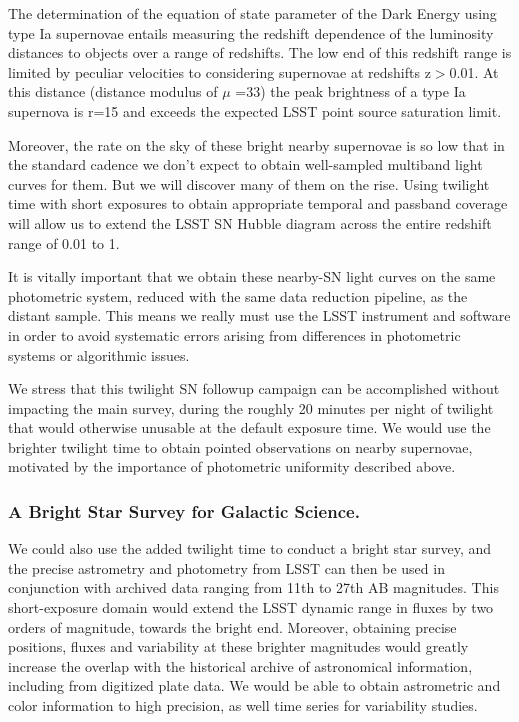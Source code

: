 The determination of the equation of state parameter of the Dark Energy using type Ia supernovae entails measuring the redshift dependence of the luminosity distances to objects over a range of redshifts. The low end of this redshift range is limited by peculiar velocities to considering supernovae at redshifts z$>$0.01. At this distance (distance modulus of 
$\mu$ =33) the peak brightness of a type Ia supernova is r=15 and exceeds the expected LSST point source saturation limit. 

Moreover, the rate on the sky of these bright nearby supernovae is so low that in the standard cadence we don't expect to obtain well-sampled multiband light curves for them. But we will discover many of them on the rise. Using twilight time with short exposures to obtain appropriate temporal and passband coverage will allow us to extend the LSST SN Hubble diagram across the entire redshift range of 0.01 to 1. 

It is vitally important that we obtain these nearby-SN light curves on the same photometric system, reduced with the same data reduction pipeline, as the distant sample. This means we really must use the LSST instrument and software in order to avoid systematic errors arising from differences in photometric systems or algorithmic issues. 

We stress that this twilight SN followup campaign can be accomplished without impacting the main survey, during the roughly 20 minutes per night of twilight that would otherwise unusable at the default exposure time. We would use the brighter twilight time to obtain pointed observations on nearby supernovae, motivated by the importance of photometric uniformity described above. 

\subsubsection{A Bright Star Survey for Galactic Science.}

We could also use the added twilight time to conduct a bright star survey, and the precise astrometry and photometry from LSST can then be used in conjunction with archived data ranging from 11th to 27th AB magnitudes. This short-exposure domain would extend the LSST dynamic range in fluxes by two orders of magnitude, towards the bright end. Moreover, obtaining precise positions, fluxes and variability at these brighter magnitudes would greatly increase the overlap with the historical archive of astronomical information, including from digitized plate data. We would be able to obtain astrometric and color information to high precision, as well time series for variability studies. 

